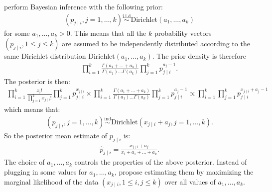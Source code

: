 \documentclass{scrartcl}
\begin{document}
\citet{MacKay1995HierarchicalDirichlet} perform Bayesian inference
with the following prior: 
\begin{align*}
  (p_{j \mid i}, j = 1, \dots, k) \overset{\text{i.i.d}}{\sim}
  \text{Dirichlet}(a_1, \dots, a_k)
\end{align*}
for some $a_1, \dots, a_k > 0$. This means that all the $k$
probability vectors $(p_{j \mid i}, 1 \leq j \leq k)$ are assumed to
be independently distributed according to the same Dirichlet
distribution $\text{Dirichlet}(a_1, \dots, a_k)$. The prior density is
therefore
\begin{align*}
  \prod_{i=1}^k \frac{\Gamma(a_1 + \dots + a_k)}{\Gamma(a_1) \dots
  \Gamma(a_k)} \prod_{j=1}^k p_{j \mid i}^{a_j - 1}. 
\end{align*}
The posterior is then:
\begin{align*}
 \prod_{i=1}^k  \frac{x_i!}{\prod_{j=1}^k x_{j \mid
  i}!} \prod_{j=1}^k p_{j \mid i}^{x_{j \mid i}} \times \prod_{i=1}^k
  \frac{\Gamma(a_1 + \dots + a_k)}{\Gamma(a_1) \dots \Gamma(a_k)}
  \prod_{j=1}^k p_{j \mid i}^{a_j - 1} \propto \prod_{i=1}^k \prod_{j=1}^k p_{j \mid i}^{x_{j \mid i} + a_j
  - 1}
\end{align*}
which means that: 
\begin{align*}
  (p_{j \mid i}, j = 1, \dots, k) \overset{\text{ind}}{\sim}
  \text{Dirichlet}(x_{j \mid i} + a_j, j = 1, \dots, k). 
\end{align*}
So the posterior mean estimate of $p_{j \mid i}$ is:
\begin{align*}
  \hat{p}_{j \mid i} = \frac{x_{j \mid i} + a_j}{x_i + a_1 + \dots +
  a_k}. 
\end{align*}
The choice of $a_1, \dots, a_k$ controls the properties of the above
posterior. Instead of plugging in some values for $a_1, \dots, a_k$,
\citet{MacKay1995HierarchicalDirichlet} propose estimating them by maximizing the
marginal likelihood of the data $(x_{j \mid i}, 1 \leq i, j \leq k)$
over all values of $a_1, \dots, a_k$.
\end{document}
